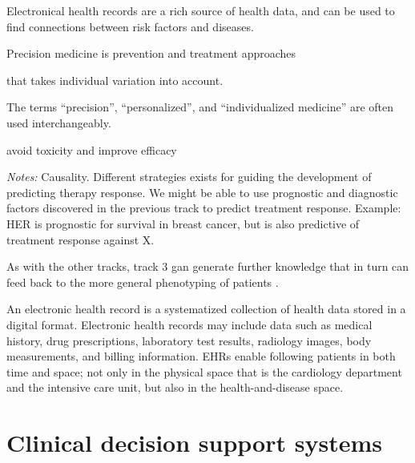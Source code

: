 Electronical health records are a rich source of health data,
and can be used to find connections between risk factors and diseases.

Precision medicine is prevention and treatment approaches

that takes individual variation into account.


The terms
\enquote{precision},
\enquote{personalized},
and \enquote{individualized medicine}
are often used interchangeably.

avoid toxicity and improve efficacy

\begin{minipage}{\linewidth}
    \emph{Notes:}
    Causality.
    Different strategies exists for guiding the development of 
    predicting therapy response.
    We might be able to use prognostic and diagnostic factors
    discovered in the previous track to predict treatment response.
    Example: HER is prognostic for survival in breast cancer,
        but is also predictive of treatment response against X.

\end{minipage}


As with the other tracks, track 3 gan generate further knowledge 
that in turn can feed back to the more general phenotyping of patients
\autocite{konigWhat2017}. 

An electronic health record
is a systematized collection of health data 
stored in a digital format.
Electronic health records may include data such as
medical history, drug prescriptions, laboratory test results,
radiology images, body measurements, and billing information.
EHRs enable following patients in both time and space;
not only in the physical space that is the cardiology department
and the intensive care unit, but also in the health-and-disease space.



\section{Clinical decision support systems}

